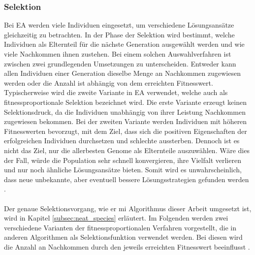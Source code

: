 \subsubsection{Selektion}
Bei \ac{EA} werden viele Individuen eingesetzt, um verschiedene Lösungsansätze gleichzeitig zu betrachten. In der Phase der Selektion wird bestimmt, welche Individuen als Elternteil für die nächste Generation ausgewählt werden und wie viele Nachkommen ihnen zustehen. Bei einem solchen Auswahlverfahren ist zwischen zwei grundlegenden Umsetzungen zu unterscheiden. Entweder kann allen Individuen einer Generation dieselbe Menge an Nachkommen zugewiesen werden oder die Anzahl ist abhängig von dem erreichten Fitnesswert. Typischerweise wird die zweite Variante in \ac{EA} verwendet, welche auch als fitnessproportionale Selektion bezeichnet wird. Die erste Variante erzeugt keinen Selektionsdruck, da die Individuen unabhängig von ihrer Leistung Nachkommen zugewiesen bekommen. Bei der zweiten Variante werden Individuen mit höheren Fitnesswerten bevorzugt, mit dem Ziel, dass sich die positiven Eigenschaften der erfolgreichen Individuen durchsetzen und schlechte aussterben. Dennoch ist es nicht das Ziel, nur die allerbesten Genome als Elternteile auszuwählen. Wäre dies der Fall, würde die Population sehr schnell konvergieren, ihre Vielfalt verlieren und nur noch ähnliche Lösungsansätze bieten. Somit wird es unwahrscheinlich, dass neue unbekannte, aber eventuell bessere Lösungsstrategien gefunden werden \cite{weicker2015evolutionare}. 
\\\\
Der genaue Selektionsvorgang, wie er mi Algorithmus dieser Arbeit umgesetzt ist, wird in Kapitel \ref{subsec:neat_species} erläutert. Im Folgenden werden zwei verschiedene Varianten der fitnessproportionalen Verfahren vorgestellt, die in anderen Algorithmen als Selektionsfunktion verwendet werden. Bei diesen wird die Anzahl an Nachkommen durch den jeweils erreichten Fitnesswert beeinflusst \cite{weicker2015evolutionare}.

